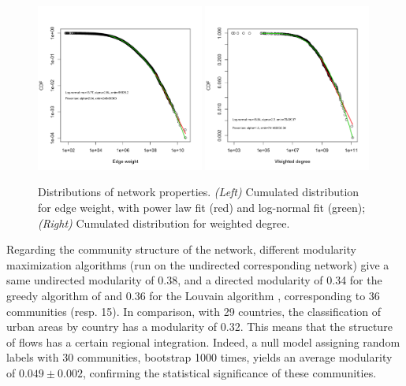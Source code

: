 \documentclass[11pt]{article}
\begin{document}
\begin{figure}
    \centering
    \includegraphics[width=0.49\textwidth]{figures/edgeweight.png}
    \includegraphics[width=0.49\textwidth]{figures/degreeDistr.png}
    \caption{Distributions of network properties. \textit{(Left)} Cumulated distribution for edge weight, with power law fit (red) and log-normal fit (green); \textit{(Right)} Cumulated distribution for weighted degree.}
    \label{fig:nwdist}
\end{figure}


Regarding the community structure of the network, different modularity maximization algorithms (run on the undirected corresponding network) give a same undirected modularity of 0.38, and a directed modularity \cite{nicosia2009extending} of 0.34 for the greedy algorithm of \cite{clauset2004finding} and 0.36 for the Louvain algorithm \cite{blondel2008fast}, corresponding to 36 communities (resp. 15). In comparison, with 29 countries, the classification of urban areas by country has a modularity of 0.32. This means that the structure of flows has a certain regional integration. Indeed, a null model assigning random labels with 30 communities, bootstrap 1000 times, yields an average modularity of $0.049 \pm 0.002$, confirming the statistical significance of these communities.
\end{document}
